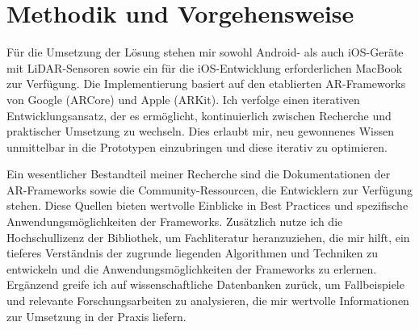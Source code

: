 \section{Methodik und Vorgehensweise}
\label{sec:methods}

F\"ur die Umsetzung der L\"osung stehen mir sowohl Android- als auch iOS-Ger\"ate mit LiDAR-Sensoren sowie ein f\"ur die iOS-Entwicklung erforderlichen MacBook zur Verf\"ugung. Die Implementierung basiert auf den etablierten AR-Frameworks von Google (ARCore) und Apple (ARKit). Ich verfolge einen iterativen Entwicklungsansatz, der es erm\"oglicht, kontinuierlich zwischen Recherche und praktischer Umsetzung zu wechseln. Dies erlaubt mir, neu gewonnenes Wissen unmittelbar in die Prototypen einzubringen und diese iterativ zu optimieren.

Ein wesentlicher Bestandteil meiner Recherche sind die Dokumentationen der AR-Frameworks sowie die Community-Ressourcen, die Entwicklern zur Verf\"ugung stehen. Diese Quellen bieten wertvolle Einblicke in Best Practices und spezifische Anwendungsm\"oglichkeiten der Frameworks. Zus\"atzlich nutze ich die Hochschullizenz der Bibliothek, um Fachliteratur heranzuziehen, die mir hilft, ein tieferes Verst\"andnis der zugrunde liegenden Algorithmen und Techniken zu entwickeln und die Anwendungsm\"oglichkeiten der Frameworks zu erlernen. Erg\"anzend greife ich auf wissenschaftliche Datenbanken zur\"uck, um Fallbeispiele und relevante Forschungsarbeiten zu analysieren, die mir wertvolle Informationen zur Umsetzung in der Praxis liefern.
